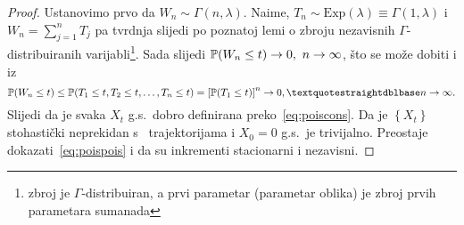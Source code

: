 \documentclass[main.tex]{subfiles}
\begin{document}
\begin{proof}
	Ustanovimo prvo da \( W_n \sim \Gamma(n, \lambda) \). Naime, \( T_n \sim \mathrm{Exp}(\lambda) \equiv \Gamma(1, \lambda) \) i
	\( W_n = \sum_{j=1}^n T_j \) pa tvrdnja slijedi po poznatoj lemi o zbroju nezavisnih \( \Gamma \)-distribuiranih varijabli\footnote{zbroj
		je \( \Gamma \)-distribuiran, a prvi parametar (parametar oblika) je zbroj prvih parametara sumanada}. Sada slijedi \( \mathbb{P}(W_n \le t) \rightarrow 0,\ n \rightarrow \infty \), što se
	može dobiti i iz
	\[
		\P(W_n \le t) \le \P(T_1 \le t, T_2 \le t, \ldots, T_n \le t) = \left[ \P(T_1 \le t) \right]^n \rightarrow 0, \textquotestraightdblbase n \ub.
	\]
	Slijedi da je svaka \( X_t \) g.s.\ dobro definirana preko~\eqref{eq:poiscons}. Da je \( \left\{ X_t \right\} \) stohastički neprekidan
	s \cadlag \ trajektorijama i \( X_0 = 0 \) g.s.\ je trivijalno. Preostaje dokazati~\eqref{eq:poispois} i da su inkrementi stacionarni i nezavisni.


\end{proof}
\end{document}
